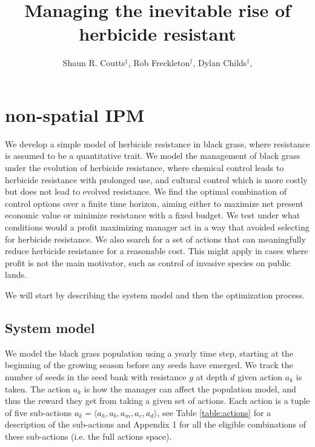 \documentclass[12pt, a4paper]{article}
\begin{document}
\title{Managing the inevitable rise of herbicide resistant}
\author{Shaun R. Coutts$^\ddag$, Rob Freckleton$^\dag$, Dylan Childs$^\dag$, }
\maketitle
\section{non-spatial IPM}
We develop a simple model of herbicide resistance in black grass, where resistance is assumed to be a quantitative trait. We model the management of black grass under the evolution of herbicide resistance, where chemical control leads to herbicide resistance with prolonged use, and cultural control which is more costly but does not lead to evolved resistance. We find the optimal combination of control options over a finite time horizon, aiming either to maximize net present economic value or minimize resistance with a fixed budget. We test under what conditions would a profit maximizing manager act in a way that avoided selecting for herbicide resistance. We also search for a set of actions that can meaningfully reduce herbicide resistance for a reasonable cost. This might apply in cases where profit is not the main motivator, such as control of invasive species on public lands.                  

We will start by describing the system model and then the optimization process.

\subsection{System model}
We model the black grass population using a yearly time step, starting at the beginning of the growing season before any seeds have emerged. We track the number of seeds in the seed bank with resistance $g$ at depth $d$ given action $a_k$ is taken. The action $a_k$ is how the manager can affect the population model, and thus the reward they get from taking a given set of actions. Each action is a tuple of five sub-actions $a_k = \langle a_h, a_b, a_m, a_c, a_d \rangle$, see Table \ref{table:actions} for a description of the sub-actions and Appendix 1 for all the eligible combinations of these sub-actions (i.e. the full actions space).      
\end{document}
